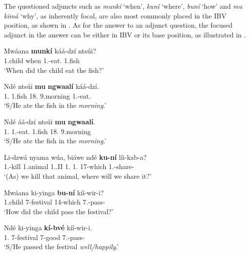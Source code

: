 \documentclass[output=paper,colorlinks,citecolor=brown,
]{langscibook}
\begin{document}
The questioned adjuncts such as \textit{munk\'{i}} `when', \textit{kun\'{i}} `where', \textit{bun\'{i}} `how' and \textit{mu kim\'{a}} `why', as inherently focal, are also most commonly placed in the IBV position, as shown in . As for the answer to an adjunct question, the focused adjunct in the answer can be either in IBV or its base position, as illustrated in .
\begin{exe}
    \ex \label{24}
    \begin{xlist}
\ex
\label{24a}
\gll
Mwáana \textbf{munkí} káá-dzí ntsúi?\\
1.child when 1\Sm{}.\Pst{}-eat.\Pst{} 1.fish\\
\trans ‘When did the child eat the fish?’

\ex
\label{24b}
\gll
Nd\'{e} ntsúi \textbf{mu} \textbf{ngwaalí} káá-dzí.\\
1.\Pro{} 1.fish 18.\Loc{} 9.morning 1\Sm{}.\Pst{}-eat.\Pst{}\\
\trans ‘S/He ate the fish in the \textit{morning}.’

\ex
\label{24c}
\gll
Nd\'{e} áá-dzí ntsúi \textbf{mu} \textbf{ngwaalí}.\\
1.\Pro{} 1\Sm{}.\Pst{}-eat.\Pst{} 1.fish 18.\Loc{} 9.morning\\
\trans ‘S/He ate the fish in the \textit{morning}.’

    \end{xlist}
\end{exe}
\begin{exe}
\ex
\label{25}
\gll
Li-dzwá nyama wúa, biáwe ndé \textbf{ku-ní} líi-kab-a? \\
1\Pl{}.\Sm{}-kill 1.animal 1.\Dem{}.II 1\Pl{}.\Pro{} 1.\Pro{} 17-which 1\Pl{}.\Fut{}-share-\Fv{}\\
\trans ‘(As) we kill that animal, where will we share it?’

\end{exe}
\begin{exe} 
    \ex \label{26}
    \begin{xlist}
\ex
\label{26a}
\gll
Mwáana ki-yinga \textbf{bu-ní} kíí-wir-i?\\
1.child 7-festival 14-which 7\Sm{}.\Pst{}-pass-\Pst{}\\
\trans ‘How did the child pass the festival?’

\ex
\label{26b}
\gll
Ndé ki-yinga \textbf{kí-bvé} kíí-wir-i.\\
1.\Pro{} 7-festival 7-good 7\Sm{}.\Pst{}-pass-\Pst{}\\
\trans ‘S/He passed the festival \textit{well/happily}.’

\end{xlist}
\end{exe}
\end{document}
